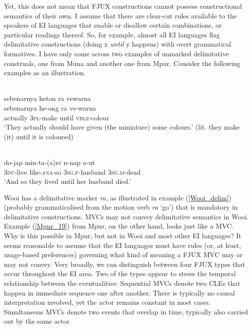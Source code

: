 Yet, this does not mean that FJUX constructions cannot possess constructional semantics of their own. I assume that there are clear-cut rules available to the speakers of EI languages that enable or disallow certain combinations, or particular readings thereof. So, for example, almost all EI languages flag delimitative constructions (doing x \textit{until} y happens) with overt grammatical formatives. I have only come across two examples of unmarked delimitative construals, one from Muna and another one from Mpur. Consider the following examples as an illustration. 

\ea \label{Wooi_delim}
\\
\glll sebenarnya heton ra vewarna \\
sebenarnya he-ong ra ve-warna \\
actually 3\textsc{pl}-make until \textsc{vblz}-colour \\
\glft `They actually should have given (the miniature) some colours.' (lit. they make (it) until it is coloured)\\ 
\z

\ea \label{Mpur_19}
\\
\gll do-jap min-ta-(a)re n-nap a-ut \\
3\textsc{du}-live like-\textsc{ana}-so 3\textsc{sg}.\textsc{f}-husband 3\textsc{sg}.\textsc{m}-dead \\
\glft `And so they lived until her husband died.'\\ 
\z

Wooi has a delimitative marker \textit{ra}, as illustrated in example (\ref{Wooi_delim}) (probably grammaticalised from the motion verb \textit{ra} `go') that is mandatory in delimitative constructions. MVCs may not convey delimitative semantics in Wooi. Example (\ref{Mpur_19}) from Mpur, on the other hand, looks just like a MVC. Why is this possible in Mpur, but not in Wooi and most other EI languages? It seems reasonable to assume that the EI languages must have rules (or, at least, usage-based preferences) governing what kind of meaning a FJUX MVC may or may not convey. Very broadly, we can distinguish between four FJUX types that occur throughout the EI area. Two of the types appear to stress the temporal relationship between the eventualities: Sequential MVCs denote two CLEs that happen in immediate sequence one after another. There is typically no causal interpretation involved, yet the actor remains constant in most cases. Simultaneous MVCs denote two events that overlap in time, typically also carried out by the same actor. 

